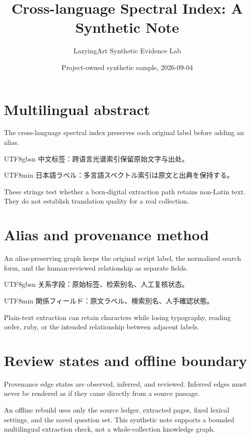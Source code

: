 \documentclass[11pt]{article}
\title{Cross-language Spectral Index: A Synthetic Note}
\author{LazyingArt Synthetic Evidence Lab}
\date{Project-owned synthetic sample, 2026-09-04}
\begin{document}
\maketitle
\begin{center}
\end{center}

\section*{Multilingual abstract}
The cross-language spectral index preserves each original label before adding
an alias.

\begin{CJK*}{UTF8}{gbsn}
中文标签：跨语言光谱索引保留原始文字与出处。
\end{CJK*}

\begin{CJK*}{UTF8}{min}
日本語ラベル：多言語スペクトル索引は原文と出典を保持する。
\end{CJK*}

These strings test whether a born-digital extraction path retains non-Latin
text. They do not establish translation quality for a real collection.

\newpage
\section*{Alias and provenance method}
An alias-preserving graph keeps the original script label, the normalized
search form, and the human-reviewed relationship as separate fields.

\begin{CJK*}{UTF8}{gbsn}
关系字段：原始标签、检索别名、人工复核状态。
\end{CJK*}

\begin{CJK*}{UTF8}{min}
関係フィールド：原文ラベル、検索別名、人手確認状態。
\end{CJK*}

Plain-text extraction can retain characters while losing typography, reading
order, ruby, or the intended relationship between adjacent labels.

\newpage
\section*{Review states and offline boundary}
Provenance edge states are observed, inferred, and reviewed. Inferred edges
must never be rendered as if they came directly from a source passage.

An offline rebuild uses only the source ledger, extracted pages, fixed lexical
settings, and the saved question set. This synthetic note supports a bounded
multilingual extraction check, not a whole-collection knowledge graph.
\end{document}
